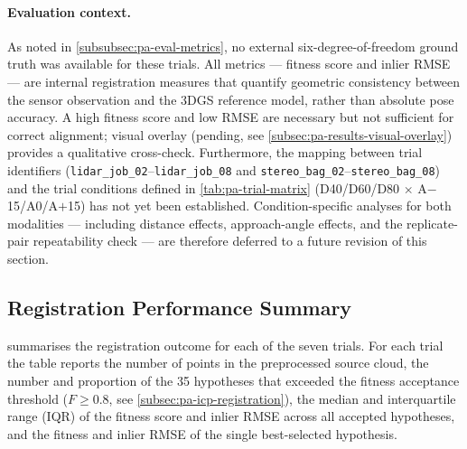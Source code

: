 \paragraph{Evaluation context.}
As noted in \cref{subsubsec:pa-eval-metrics}, no external six-degree-of-freedom ground truth was available for these trials. All metrics --- fitness score and inlier RMSE --- are internal registration measures that quantify geometric consistency between the sensor observation and the 3DGS reference model, rather than absolute pose accuracy. A high fitness score and low RMSE are necessary but not sufficient for correct alignment; visual overlay (pending, see \cref{subsec:pa-results-visual-overlay}) provides a qualitative cross-check. Furthermore, the mapping between trial identifiers (\texttt{lidar\_job\_02}--\texttt{lidar\_job\_08} and \texttt{stereo\_bag\_02}--\texttt{stereo\_bag\_08}) and the trial conditions defined in \cref{tab:pa-trial-matrix} (D40/D60/D80 $\times$ A$-$15/A0/A$+$15) has not yet been established. Condition-specific analyses for both modalities --- including distance effects, approach-angle effects, and the replicate-pair repeatability check --- are therefore deferred to a future revision of this section.

\subsection{Registration Performance Summary}
\label{subsec:pa-results-registration-summary}

 summarises the registration outcome for each of the seven trials. For each trial the table reports the number of points in the preprocessed source cloud, the number and proportion of the 35 hypotheses that exceeded the fitness acceptance threshold ($F \geq 0.8$, see \cref{subsec:pa-icp-registration}), the median and interquartile range (IQR) of the fitness score and inlier RMSE across all accepted hypotheses, and the fitness and inlier RMSE of the single best-selected hypothesis.


